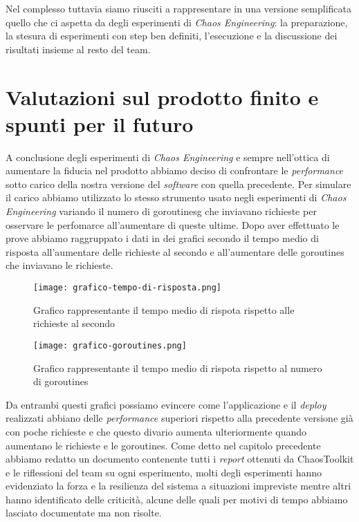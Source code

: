 Nel complesso tuttavia siamo riusciti a rappresentare in una versione semplificata quello che ci aspetta da degli esperimenti di \textit{Chaos Engineering}: la preparazione, la stesura di esperimenti con step ben definiti, l'esecuzione e la discussione dei risultati insieme al resto del team.

\section{Valutazioni sul prodotto finito e spunti per il futuro}
A conclusione degli esperimenti di \textit{Chaos Engineering} e sempre nell'ottica di aumentare la fiducia nel prodotto abbiamo deciso di confrontare le \textit{performance} sotto carico della nostra versione del \textit{software} con quella precedente.
Per simulare il carico abbiamo utilizzato lo stesso strumento usato negli esperimenti di \textit{Chaos Engineering} variando il numero di \gls{goroutinesg} che inviavano richieste per osservare le perfomarce all'aumentare di queste ultime.
Dopo aver effettuato le prove abbiamo raggruppato i dati in dei grafici secondo il tempo medio di risposta all'aumentare delle richieste al secondo e all'aumentare delle goroutines che inviavano le richieste.
\begin{figure}[H]
    \centering
    \texttt{[image: grafico-tempo-di-risposta.png]}
    \caption{Grafico rappresentante il tempo medio di rispota rispetto alle richieste al secondo}
    \label{tab:graph-req-sec}
\end{figure}
\begin{figure}[H]
    \centering
    \texttt{[image: grafico-goroutines.png]}
    \caption{Grafico rappresentante il tempo medio di rispota rispetto al numero di goroutines}
    \label{tab:graph-goroutines}
\end{figure}

Da entrambi questi grafici possiamo evincere come l'applicazione e il \textit{deploy} realizzati abbiano delle \textit{performance} superiori rispetto alla precedente versione già con poche richieste e che questo divario aumenta ulteriormente quando aumentano le richieste e le goroutines.
Come detto nel capitolo precedente abbiamo redatto un documento contenente tutti i \textit{report} ottenuti da ChaosToolkit e le riflessioni del team su ogni esperimento, molti degli esperimenti hanno evidenziato la forza e la resilienza del sistema a situazioni impreviste mentre altri hanno identificato delle criticità, alcune delle quali per motivi di tempo abbiamo lasciato documentate ma non risolte.